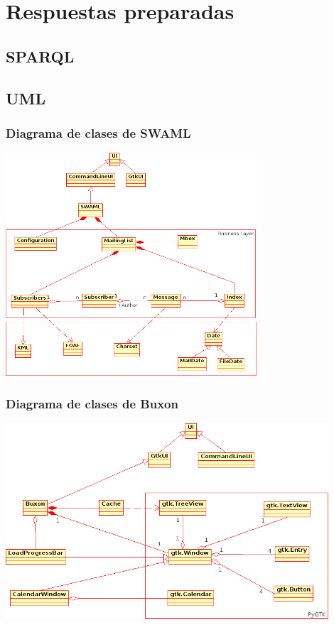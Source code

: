 \documentclass[spanish,notes=hide]{beamer}
\begin{document}
\appendix

\section{Respuestas preparadas}

\subsection{SPARQL}
\frame
{
\begin{center}
  \SPARQL
\end{center}
}

\subsection{UML}
\frame
{
  \frametitle{Diagrama de clases de SWAML}
  \begin{center}
    \includegraphics[width=0.7\textwidth]{images/clases-swaml.png}
  \end{center}
}
\frame
{
  \frametitle{Diagrama de clases de Buxon}
  \begin{center}
    \includegraphics[width=0.9\textwidth]{images/clases-buxon.png}
  \end{center}
}
\end{document}

